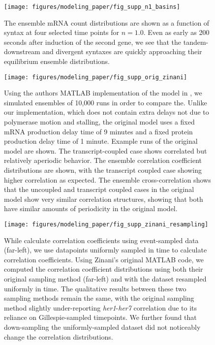 \documentclass[11pt]{article}
\begin{document}
\begin{figure}[hbtp]
    \centering
    \texttt{[image: figures/modeling\_paper/fig\_supp\_n1\_basins]}
    \caption{The ensemble mRNA count distributions are shown as a function of syntax at four selected time points for \(n = 1.0\). Even as early as 200 seconds after induction of the second gene, we see that the tandem-downstream and divergent syntaxes are quickly approaching their equilibrium ensemble distributions.}
    \label{fig:supp:n1_toggle_distributions}
\end{figure}

\begin{figure}[hbtp]
    \centering
    {\texttt{[image: figures/modeling\_paper/fig\_supp\_orig\_zinani]}
    \label{fig:supp:zinani_matlab_mRNA}
    \label{fig:supp:zinani_matlab_correlation}
    \label{fig:supp:zinani_matlab_cross_correlation}
    }
    \caption{Using the authors MATLAB implementation of the model in \textcite{zinaniPairingSegmentationClock2021}, we simulated ensembles of 10,000 runs in order to compare the. Unlike our implementation, which does not contain extra delays not due to polymerase motion and stalling, the original model uses a fixed mRNA production delay time of 9 minutes and a fixed protein production delay time of 1 minute.
         Example runs of the original model are shown. The transcript-coupled case shows correlated but relatively aperiodic behavior.
         The ensemble correlation coefficient distributions are shown, with the transcript coupled case showing higher correlation as expected.
         The ensemble cross-correlation shows that the uncoupled and transcript coupled cases in the original model show very similar correlation structures, showing that both have similar amounts of periodicity in the original model.
    }
    \label{fig:top:zinani_matlab}
\end{figure}

\begin{figure}[hbtp]
    \centering
    {\texttt{[image: figures/modeling\_paper/fig\_supp\_zinani\_resampling]}
    }
    \caption{While \textcite{zinaniPairingSegmentationClock2021} calculate correlation coefficients using event-sampled data (far-left), we use datapoints uniformly sampled in time to calculate correlation coefficients. Using Zinani's original MATLAB code, we computed the correlation coefficient distributions using both their original sampling method (far-left) and with the dataset resampled uniformly in time. The qualitative results between these two sampling methods remain the same, with the original sampling method slightly under-reporting \textit{her1}-\textit{her7} correlation due to its reliance on Gillespie-sampled timepoints. We further found that down-sampling the uniformly-sampled dataset did not noticeably change the correlation distributions.
    }
    \label{fig:top:supp_zinani_sampling}
\end{figure}
\end{document}
